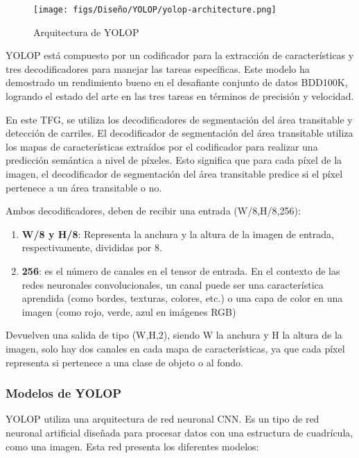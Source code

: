 \begin{figure} [H]
  \begin{center}
    \texttt{[image: figs/Diseño/YOLOP/yolop-architecture.png]}
  \end{center}
  \caption{Arquitectura de YOLOP}
  \label{fig:Arq_YOLOP}
  \vspace{-1.5em}
\end{figure}

YOLOP está compuesto por un codificador para la extracción de características y tres decodificadores para manejar las tareas específicas. Este modelo ha demostrado un rendimiento 
bueno en el desafiante conjunto de datos BDD100K\cite{BDD100K}, logrando el estado del arte en las tres tareas en términos de precisión y velocidad. 

En este TFG, se utiliza los decodificadores de segmentación del área transitable 
y detección de carriles. El decodificador de segmentación del área transitable utiliza los mapas de características
extraídos por el codificador para realizar una predicción semántica a nivel de píxeles. Esto significa que 
para cada píxel de la imagen, el decodificador de segmentación del área transitable predice si el píxel 
pertenece a un área transitable o no. 

Ambos decodificadores, deben de recibir una entrada (W/8,H/8,256):  
\begin{enumerate}
  \item \textbf{W/8 y H/8}: Representa la anchura y la altura de la imagen de entrada, respectivamente, divididas por 8.
  \item \textbf{256}: es el número de 
  canales en el tensor de entrada. En el contexto de las redes neuronales convolucionales, 
  un canal puede ser una característica aprendida (como bordes, texturas, colores, etc.) o una capa de color en una imagen (como rojo, verde, azul en imágenes RGB)
\end{enumerate}

Devuelven una salida de tipo (W,H,2), siendo W la anchura y H la altura de la imagen, solo hay dos canales en cada mapa de características, ya que cada píxel 
representa si pertenece a una clase de objeto o al fondo. 

\subsubsection{Modelos de YOLOP}
\label{sec:Modelo_YOLOP}

YOLOP utiliza una arquitectura de red neuronal CNN. Es un tipo de red neuronal artificial diseñada para procesar datos con una
estructura de cuadrícula, como una imagen. Esta red presenta los diferentes modelos:

